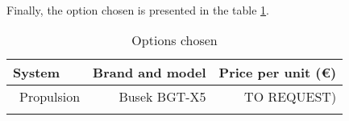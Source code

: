 \paragraph{}Finally, the option chosen is presented in the table \ref{propulsionfinal}.

\begin{longtable}{| l | r | r | }
\hline
\rowcolor[gray]{0.80}	\textbf{System} &  \textbf{Brand and model}     & \textbf{Price per unit (\euro)}   \\
\hline
\endfirsthead

	   ~Propulsion & Busek BGT-X5 & TO REQUEST) \\
	\hline

\caption{Options chosen}
\label{propulsionfinal}
\end{longtable}
